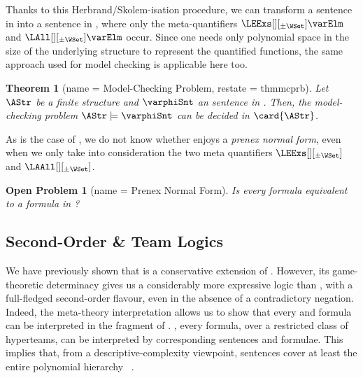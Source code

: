 \documentclass[authoryear]{elsarticle}
\newtheorem{theorem}{Theorem}
\newtheorem{openproblem}{Open Problem}
\begin{document}
Thanks to this Herbrand/Skolem-isation procedure, we can transform a \ADIF
sentence in \pnf into a \Meta sentence in \pnf, where only the meta-quantifiers
$\LEExs[][_{\pm\WSet}] \varElm$ and $\LAll[][_{\pm\WSet}] \varElm$ occur.
Since one needs only polynomial space in the size of the underlying structure to
represent the quantified functions, the same approach used for \FOL model
checking is applicable here too.

\begin{theorem}[name = Model-Checking Problem, restate = thmmcprb]
  \label{thm:mcprb}
  Let $\AStr$ be a finite structure and $\varphiSnt$ an \ADIF sentence in \pnf.
  Then, the model-checking problem $\AStr \models \varphiSnt$ can be decided in
  \PSpace \wrt $\card{\AStr}$.
\end{theorem}

As is the case of \ADIF, we do not know whether \Meta enjoys a \emph{prenex
normal form}, even when we only take into consideration the two meta quantifiers
$\LEExs[][_{\pm\WSet}]$ and $\LAAll[][_{\pm\WSet}]$.

\begin{openproblem}[name = \Meta Prenex Normal Form]
  \label{opn:metapnf}
  Is every \Meta formula equivalent to a \Meta formula in \pnf?
\end{openproblem}






\subsection{Second-Order \& Team Logics}
\label{sec:metthr;sub:stl}

We have previously shown that \ADIF is a conservative extension of \DIF.
%
However, its game-theoretic determinacy gives us a considerably more expressive
logic than \DIF, with a full-fledged second-order flavour, even in the absence
of a contradictory negation.
%
Indeed, the meta-theory interpretation allows us to show that every \SOL and \TL
formula can be interpreted in the \ADF fragment of \ADIF.
\Viceversa, every \ADF formula, over a restricted class of hyperteams, can be
interpreted by corresponding \SOL sentences and \TL formulae.
%
This implies that, from a descriptive-complexity viewpoint, \ADF sentences cover
at least the entire polynomial hierarchy \PH~\citep{Imm99}.
\end{document}
